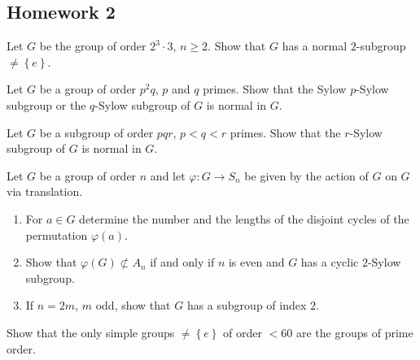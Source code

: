 \subsection{Homework 2}
\begin{problem}
  Let $G$ be the group of order $2^3\cdot 3$, $n\geq 2$. Show that $G$ has
  a normal $2$-subgroup $\neq\left\{e\right\}$.
\end{problem}
\begin{solution}
\end{solution}

\begin{problem}
  Let $G$ be a group of order $p^2q$, $p$ and $q$ primes. Show that the
  Sylow $p$-Sylow subgroup or the $q$-Sylow subgroup of $G$ is normal in
  $G$.
\end{problem}
\begin{solution}
\end{solution}

\begin{problem}
  Let $G$ be a subgroup of order $pqr$, $p<q<r$ primes. Show that the
  $r$-Sylow subgroup of $G$ is normal in $G$.
\end{problem}
\begin{solution}
\end{solution}

\begin{problem}
  Let $G$ be a group of order $n$ and let $\varphi\colon G\to S_n$ be given
  by the action of $G$ on $G$ via translation.
  \begin{enumerate}[label=(\alph*),noitemsep]
  \item For $a\in G$ determine the number and the lengths of the disjoint
    cycles of the permutation $\varphi(a)$.
  \item Show that $\varphi(G)\nsubset A_n$ if and only if $n$ is even and
    $G$ has a cyclic $2$-Sylow subgroup.
  \item If $n=2m$, $m$ odd, show that $G$ has a subgroup of index $2$.
  \end{enumerate}
\end{problem}
\begin{solution}
\end{solution}

\begin{problem}
  Show that the only simple groups $\neq\left\{e\right\}$ of order $<60$
  are the groups of prime order.
\end{problem}
\begin{solution}
\end{solution}

